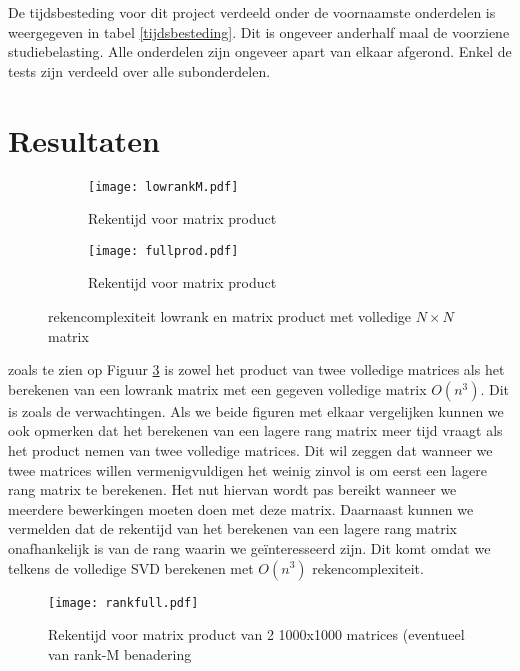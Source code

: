 \documentclass[a4paper]{article}
\begin{document}
De tijdsbesteding voor dit project verdeeld onder de voornaamste onderdelen is weergegeven in tabel \ref{tijdsbesteding}. Dit is ongeveer anderhalf maal de voorziene studiebelasting. Alle onderdelen zijn ongeveer apart van elkaar afgerond. Enkel de tests zijn verdeeld over alle subonderdelen.


\section*{Resultaten}

\begin{figure}
\centering
\begin{subfigure}{.48\textwidth}
	\centering
	\texttt{[image: lowrankM.pdf]}
	\caption{Rekentijd voor matrix product}
	\label{lowrank}
\end{subfigure}
\begin{subfigure}{.48\textwidth}
	\centering
	\texttt{[image: fullprod.pdf]}
	\caption{Rekentijd voor matrix product}
	\label{fullprod}
\end{subfigure}
\caption{rekencomplexiteit lowrank en matrix product met volledige $N \times N$ matrix}
\label{o3complex}
\end{figure}

zoals te zien op Figuur \ref{o3complex} is zowel het product van twee volledige matrices als het berekenen van een lowrank matrix met een gegeven volledige matrix \(O(n^3)\). Dit is zoals de verwachtingen. Als we beide figuren met elkaar vergelijken kunnen we ook opmerken dat het berekenen van een lagere rang matrix meer tijd vraagt als het product nemen van twee volledige matrices. Dit wil zeggen dat wanneer we twee matrices willen vermenigvuldigen het weinig zinvol is om eerst een lagere rang matrix te berekenen. Het nut hiervan wordt pas bereikt wanneer we meerdere bewerkingen moeten doen met deze matrix. Daarnaast kunnen we vermelden dat de rekentijd van het berekenen van een lagere rang matrix onafhankelijk is van de rang waarin we ge\"interesseerd zijn. Dit komt omdat we telkens de volledige SVD berekenen met \(O(n^3)\) rekencomplexiteit.

\begin{figure}
\centering
	\texttt{[image: rankfull.pdf]}
	\caption{Rekentijd voor matrix product van 2 1000x1000 matrices (eventueel van rank-M benadering}
	\label{rankfullplot}
\end{figure}
\end{document}
